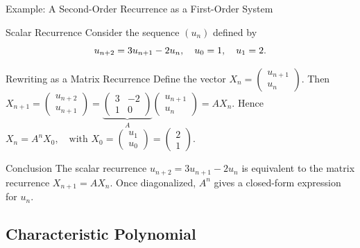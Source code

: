 \documentclass[aspectratio=169]{beamer}
\begin{document}
\begin{frame}{Example: A Second-Order Recurrence as a First-Order System}

\begin{block}{Scalar Recurrence}
Consider the sequence $(u_n)$ defined by
\vspace{-5mm}
\[
u_{n+2} = 3u_{n+1} - 2u_n, \quad u_0 = 1, \quad u_1 = 2.
\vspace{-6mm}
\]
\end{block}

\pause

\begin{block}{Rewriting as a Matrix Recurrence}
Define the vector
$
X_n =
\begin{pmatrix}
u_{n+1}\\
u_n
\end{pmatrix}.
$
Then
$
X_{n+1} =
\begin{pmatrix}
u_{n+2}\\
u_{n+1}
\end{pmatrix}
=
\underbrace{
\begin{pmatrix}
3 & -2\\
1 & 0
\end{pmatrix}}_{A}
\begin{pmatrix}
u_{n+1}\\
u_n
\end{pmatrix}
= A X_n.
$
Hence
$
X_n = A^n X_0, \quad \text{with } X_0 = 
\begin{pmatrix}u_1\\u_0\end{pmatrix}
= 
\begin{pmatrix}2\\1\end{pmatrix}.
$
\end{block}

\pause

\begin{exampleblock}{Conclusion}
The scalar recurrence $u_{n+2}=3u_{n+1}-2u_n$ is equivalent to the matrix recurrence $X_{n+1}=A X_n$.  
Once diagonalized, $A^n$ gives a closed-form expression for $u_n$.
\end{exampleblock}

\end{frame}


\subsection{Characteristic Polynomial}
\end{document}
